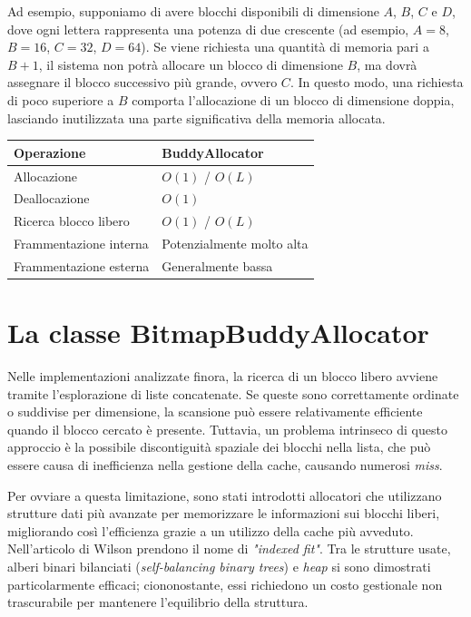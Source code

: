 Ad esempio, supponiamo di avere blocchi disponibili di dimensione $A$, $B$, $C$ e $D$, dove ogni lettera rappresenta una potenza di due crescente (ad esempio, $A = 8$, $B = 16$, $C = 32$, $D = 64$). Se viene richiesta una quantità di memoria pari a $B+1$, il sistema non potrà allocare un blocco di dimensione $B$, ma dovrà assegnare il blocco successivo più grande, ovvero $C$. In questo modo, una richiesta di poco superiore a $B$ comporta l'allocazione di un blocco di dimensione doppia, lasciando inutilizzata una parte significativa della memoria allocata.

\begin{center}
\begin{tabular}{|l|l|}
\hline
Operazione & BuddyAllocator \\
\hline
Allocazione & $O(1)$ / $O(L)$ \\
Deallocazione & $O(1)$ \\
Ricerca blocco libero & $O(1)$ / $O(L)$ \\
Frammentazione interna & Potenzialmente molto alta \\
Frammentazione esterna & Generalmente bassa \\
\hline
\end{tabular}
\end{center}

\section{La classe BitmapBuddyAllocator}
Nelle implementazioni analizzate finora, la ricerca di un blocco libero avviene tramite l'esplorazione di liste concatenate. Se queste sono correttamente ordinate o suddivise per dimensione, la scansione può essere relativamente efficiente quando il blocco cercato è presente. Tuttavia, un problema intrinseco di questo approccio è la possibile discontiguità spaziale dei blocchi nella lista, che può essere causa di inefficienza nella gestione della cache, causando numerosi \textit{miss}.

Per ovviare a questa limitazione, sono stati introdotti allocatori che utilizzano strutture dati più avanzate per memorizzare le informazioni sui blocchi liberi, migliorando così l’efficienza grazie a un utilizzo della cache più avveduto. Nell’articolo di Wilson prendono il nome di \textit{"indexed fit"}. Tra le strutture usate, alberi binari bilanciati (\textit{self-balancing binary trees}) e \textit{heap} si sono dimostrati particolarmente efficaci; ciononostante, essi richiedono un costo gestionale non trascurabile per mantenere l’equilibrio della struttura.

